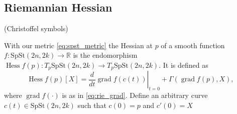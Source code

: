 \subsection{Riemannian Hessian}
(Christoffel symbols)

With our metric \ref{eq:spst_metric} the Hessian at $p$ of a smooth function $f:\mathrm{SpSt}(2n, 2k)\xrightarrow{}\mathbb{R}$ is the endomorphism $\operatorname{Hess}f(p):T_{p}\mathrm{SpSt}(2n, 2k)\xrightarrow{}T_{p}\mathrm{SpSt}(2n, 2k)$. It is defined as
$$\operatorname{Hess}f(p)[X]=\left.\frac{d}{dt}\operatorname{grad}f(c(t))\right|_{t=0}+\Gamma(\operatorname{grad}f(p),X),$$
where $\operatorname{grad}f(\cdot)$ is as in \ref{eq:rie_grad}. Define an arbitrary curve $c(t)\in \mathrm{SpSt}(2n, 2k)$ such that $c(0)=p$ and $c'(0)=X$ %